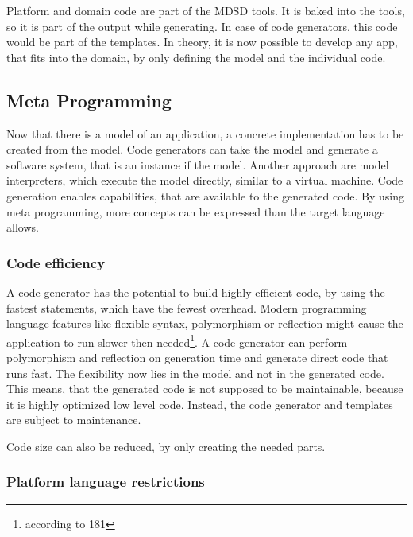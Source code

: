 Platform and domain code are part of the \ac{MDSD} tools.
It is baked into the tools, so it is part of the output while generating.
In case of code generators, this code would be part of the templates.
In theory, it is now possible to develop any app, that fits into the domain, by only defining the model and the individual code.

\subsection{Meta Programming}

Now that there is a model of an application, a concrete implementation has to be created from the model.
Code generators can take the model and generate a software system, that is an instance if the model.
Another approach are model interpreters, which execute the model directly, similar to a virtual machine.
Code generation enables capabilities, that are available to the generated code.
By using meta programming, more concepts can be expressed than the target language allows.

\subsubsection{Code efficiency}

A code generator has the potential to build highly efficient code, by using the fastest statements, which have the fewest overhead.
Modern programming language features like flexible syntax, polymorphism or reflection might cause the application to run slower then needed\footnote{according to \cite{stahl_model-driven_2006} 181}.
A code generator can perform polymorphism and reflection on generation time and generate direct code that runs fast.
The flexibility now lies in the model and not in the generated code.
This means, that the generated code is not supposed to be maintainable, because it is highly optimized low level code.
Instead, the code generator and templates are subject to maintenance.

Code size can also be reduced, by only creating the needed parts.

\subsubsection{Platform language restrictions}

